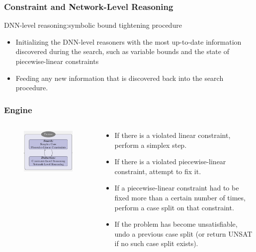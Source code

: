\documentclass[aspectratio=169%
,serif,mathserif]{beamer}
\begin{document}
\begin{frame}
	\frametitle{Constraint and Network-Level Reasoning}
	DNN-level reasoning:symbolic bound tightening procedure
	\begin{itemize}
		\item Initializing the DNN-level reasoners with the most up-to-date information discovered during the search, such as variable bounds and the state of piecewise-linear constraints
		\item Feeding any new information that is discovered back into the search procedure.
	\end{itemize}
\end{frame}

\begin{frame}
	\frametitle{Engine}
	\begin{columns}
		\begin{column}{.4\textwidth}
			\begin{figure}[htbp]
				\includegraphics[width=1\linewidth]{4.png}
			\end{figure}
		\end{column}

		\begin{column}{.6\textwidth}
			\begin{itemize}
				\item If there is a violated linear constraint, perform a simplex step.
				\item If there is a violated piecewise-linear constraint, attempt to fix it.
				\item If a piecewise-linear constraint had to be fixed more than a certain number of times, perform a case split on that constraint.
				\item If the problem has become unsatisfiable, undo a previous case split (or return UNSAT if no such case split exists).


\end{itemize}
\end{column}
\end{columns}
\end{frame}
\end{document}
